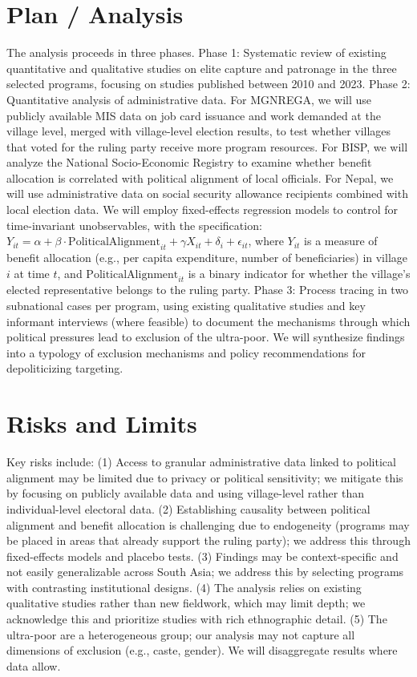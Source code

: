 \documentclass[10pt]{article}
\begin{document}
\section*{Plan / Analysis}
The analysis proceeds in three phases. Phase 1: Systematic review of existing quantitative and qualitative studies on elite capture and patronage in the three selected programs, focusing on studies published between 2010 and 2023. Phase 2: Quantitative analysis of administrative data. For MGNREGA, we will use publicly available MIS data on job card issuance and work demanded at the village level, merged with village-level election results, to test whether villages that voted for the ruling party receive more program resources. For BISP, we will analyze the National Socio-Economic Registry to examine whether benefit allocation is correlated with political alignment of local officials. For Nepal, we will use administrative data on social security allowance recipients combined with local election data. We will employ fixed-effects regression models to control for time-invariant unobservables, with the specification: $Y_{it} = \alpha + \beta \cdot \text{PoliticalAlignment}_{it} + \gamma X_{it} + \delta_i + \epsilon_{it}$, where $Y_{it}$ is a measure of benefit allocation (e.g., per capita expenditure, number of beneficiaries) in village $i$ at time $t$, and $\text{PoliticalAlignment}_{it}$ is a binary indicator for whether the village's elected representative belongs to the ruling party. Phase 3: Process tracing in two subnational cases per program, using existing qualitative studies and key informant interviews (where feasible) to document the mechanisms through which political pressures lead to exclusion of the ultra-poor. We will synthesize findings into a typology of exclusion mechanisms and policy recommendations for depoliticizing targeting.

\section*{Risks and Limits}
Key risks include: (1) Access to granular administrative data linked to political alignment may be limited due to privacy or political sensitivity; we mitigate this by focusing on publicly available data and using village-level rather than individual-level electoral data. (2) Establishing causality between political alignment and benefit allocation is challenging due to endogeneity (programs may be placed in areas that already support the ruling party); we address this through fixed-effects models and placebo tests. (3) Findings may be context-specific and not easily generalizable across South Asia; we address this by selecting programs with contrasting institutional designs. (4) The analysis relies on existing qualitative studies rather than new fieldwork, which may limit depth; we acknowledge this and prioritize studies with rich ethnographic detail. (5) The ultra-poor are a heterogeneous group; our analysis may not capture all dimensions of exclusion (e.g., caste, gender). We will disaggregate results where data allow.
\end{document}
